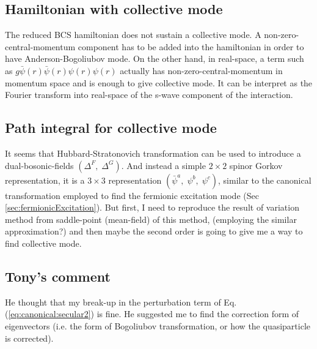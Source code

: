 \subsection{Hamiltonian with collective mode}
The reduced BCS hamiltonian does not sustain a collective mode.  A non-zero-central-momentum component has to be added into the hamiltonian in order to have Anderson-Bogoliubov mode.  On the other hand, in real-space, a term such as $g\bar\psi(r)\bar\psi(r)\psi(r)\psi(r)$ actually has non-zero-central-momentum in momentum space and is enough to give collective mode.  It can be interpret as the Fourier transform into real-space of the s-wave component of the interaction.  

\subsection{Path integral for collective mode} 
It seems that Hubbard-Stratonovich transformation \cite{Altland} can be used to introduce a dual-bosonic-fields $(\Delta^{F},\;\Delta^{G})$. And instead a simple $2\times2$ spinor Gorkov representation, it is a $3\times3$ representation $(\bar\psi^{a},\;\psi^{b},\;\psi^{c})$, similar to the canonical transformation employed to find the fermionic excitation mode (Sec \ref{sec:fermionicExcitation}).  But first, I need to reproduce the result of variation method from saddle-point (mean-field) of this method, (employing the similar approximation?) and then maybe the second order is going to give me a way to find collective mode. 

\subsection{Tony's comment}
He thought that my break-up in the perturbation term of Eq. (\ref{eq:canonical:secular2}) is fine.  He suggested me to find the correction form of eigenvectors (i.e. the form of Bogoliubov transformation, or how the quasiparticle is corrected). 